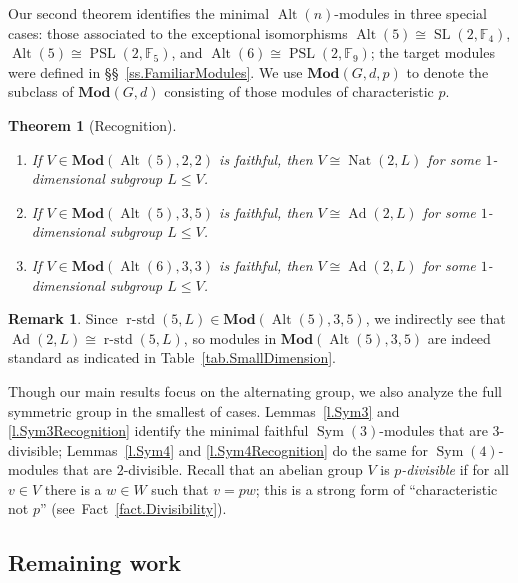 \documentclass[a4paper, 11pt]{amsart}
\theoremstyle{plain}
\newcounter{MainTheoremCounter}
\newtheorem{MainTheorem}[MainTheoremCounter]{Theorem}
\theoremstyle{definition}
\newtheorem{remark}[theorem]{Remark}
\theoremstyle{remark}
\DeclareMathOperator{\Sym}{Sym}
\DeclareMathOperator{\Alt}{Alt}
\DeclareMathOperator{\rstd}{r-std}
\DeclareMathOperator{\PSL}{PSL}
\DeclareMathOperator{\SL}{SL}
\DeclareMathOperator{\Nat}{Nat}
\DeclareMathOperator{\Ad}{Ad}
\newcommand{\Mod}{\mathbf{Mod}}
\newcommand{\bF}{\mathbb{F}}
\begin{document}
Our second theorem identifies the minimal $\Alt(n)$-modules in three special cases: those associated to the exceptional isomorphisms $\Alt(5)\cong\SL(2,\bF_4)$, $\Alt(5)\cong\PSL(2,\bF_5)$, and $\Alt(6)\cong\PSL(2,\bF_9)$; the target modules were defined in \S\S~\ref{ss.FamiliarModules}. We use $\Mod(G,d,p)$ to denote the subclass of $\Mod(G,d)$ consisting of those modules of characteristic $p$.

\begin{MainTheorem}[Recognition]\label{t.AltRec} 
\hfill

\begin{enumerate}
\item If $V\in \Mod(\Alt(5),2,2)$ is faithful, then $V\cong \Nat(2,L)$ for some $1$-dimensional subgroup $L\le V$.
\item If $V\in \Mod(\Alt(5),3,5)$ is faithful, then $V\cong \Ad(2,L)$ for some $1$-dimensional subgroup $L\le V$. 
\item If $V\in \Mod(\Alt(6),3,3)$ is faithful, then $V\cong \Ad(2,L)$ for some $1$-dimensional subgroup $L\le V$. 
\end{enumerate}
\end{MainTheorem}

\begin{remark}\label{r:actuallystandard}
Since  $\rstd(5,L)\in \Mod(\Alt(5),3,5)$, we indirectly see that $\Ad(2,L)\cong \rstd(5,L)$, so  modules in $\Mod(\Alt(5),3,5)$ are indeed standard as indicated in Table~\ref{tab.SmallDimension}.
\end{remark}

Though our main results focus on the alternating group, we also analyze the full symmetric group in the smallest of cases.  Lemmas~\ref{l.Sym3} and \ref{l.Sym3Recognition} identify the minimal faithful $\Sym(3)$-modules that are $3$-divisible; Lemmas~\ref{l.Sym4} and \ref{l.Sym4Recognition} do the same for  $\Sym(4)$-modules that are $2$-divisible. Recall that an abelian group $V$ is \emph{$p$-divisible} if for all $v\in V$ there is a $w \in W$ such that $v = pw$; this is a strong form of ``characteristic not $p$'' (see~Fact~\ref{fact.Divisibility}).


\subsection{Remaining work}\label{ss.RemainingWork}
\end{document}
